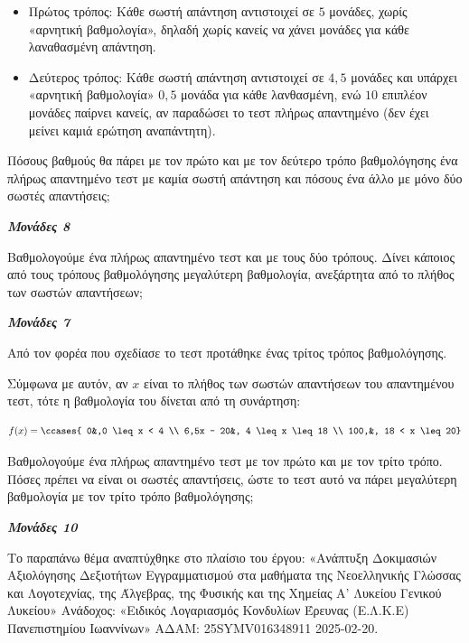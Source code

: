 \documentclass[11pt,a4paper,twoside]{book}
\newcommand{\monades}[1]{
\hspace*{\fill}
\textbf{\textit{\textcolor{maincolor}{Μονάδες #1}}}}
\begin{document}
\begin{itemize}
\item
  Πρώτος τρόπος: Κάθε σωστή απάντηση αντιστοιχεί σε $5$ μονάδες, χωρίς «αρνητική βαθμολογία», δηλαδή χωρίς κανείς να χάνει μονάδες για κάθε λαναθασμένη απάντηση.
\item
  Δεύτερος τρόπος: Κάθε σωστή απάντηση αντιστοιχεί σε $4,5$ μονάδες και υπάρχει «αρνητική βαθμολογία» $0,5$ μονάδα για κάθε λανθασμένη, ενώ $10$ επιπλέον μονάδες παίρνει κανείς, αν παραδώσει το τεστ πλήρως απαντημένο (δεν έχει μείνει καμιά ερώτηση αναπάντητη).
\end{itemize}

\begin{alist}
\item Πόσους βαθμούς θα πάρει με τον πρώτο και με τον δεύτερο τρόπο βαθμολόγησης ένα πλήρως απαντημένο τεστ με καμία σωστή απάντηση και πόσους ένα άλλο με μόνο δύο σωστές απαντήσεις;
\monades{8}
\item Βαθμολογούμε ένα πλήρως απαντημένο τεστ και με τους δύο τρόπους. Δίνει κάποιος από τους τρόπους βαθμολόγησης μεγαλύτερη βαθμολογία, ανεξάρτητα από το πλήθος των σωστών απαντήσεων;
\monades{7}
\item Από τον φορέα που σχεδίασε το τεστ προτάθηκε ένας τρίτος τρόπος βαθμολόγησης.

Σύμφωνα με αυτόν, αν $x$ είναι το πλήθος των σωστών απαντήσεων του απαντημένου τεστ, τότε η βαθμολογία του δίνεται από τη συνάρτηση:

\begin{equation*}f(x) = \ccases{
0&,0 \leq x < 4 \\
6,5x - 20&, 4 \leq x \leq 18 \\
100,&, 18 < x \leq 20}
\end{equation*}

Βαθμολογούμε ένα πλήρως απαντημένο τεστ με τον πρώτο και με τον τρίτο τρόπο. Πόσες πρέπει να είναι οι σωστές απαντήσεις, ώστε το τεστ αυτό να πάρει μεγαλύτερη βαθμολογία με τον τρίτο τρόπο βαθμολόγησης;

\monades{10}

{\footnotesize Το παραπάνω θέμα αναπτύχθηκε στο πλαίσιο του έργου: «Ανάπτυξη Δοκιμασιών Αξιολόγησης Δεξιοτήτων Εγγραμματισμού στα μαθήματα της Νεοελληνικής Γλώσσας και Λογοτεχνίας, της Άλγεβρας, της Φυσικής και της Χημείας Α' Λυκείου Γενικού Λυκείου» Ανάδοχος: «Ειδικός Λογαριασμός Κονδυλίων Έρευνας (Ε.Λ.Κ.Ε) Πανεπιστημίου Ιωαννίνων» ΑΔΑΜ: 25SYMV016348911 2025-02-20.}
\end{alist}
\end{document}
